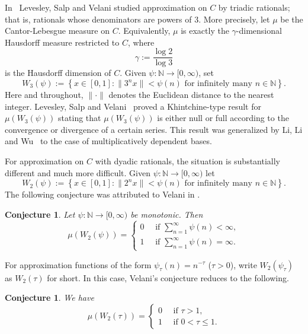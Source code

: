 \documentclass[10pt,a4paper]{amsart}
\numberwithin{equation}{section} %
\newtheorem{conj}[thm]{Conjecture}
\newtheorem{specialcon}{Conjecture}
\newcommand{\N}{\mathbb{N}}
\begin{document}
In~\cite{LSV07O} Levesley, Salp and Velani studied approximation on $C$ by triadic rationals; that is, rationals whose  denominators  are powers of $3$.  More precisely, let $\mu$ be the  Cantor-Lebesgue measure on $C$. Equivalently, $\mu$ is exactly the $\gamma$-dimensional Hausdorff measure restricted to $C$, where 
\[\gamma:=\frac{\log2}{\log3}\]
is the Hausdorff dimension of $C$. Given $\psi: \N\to [0,\infty)$, set 
\[W_3(\psi):=\left\{x\in [0,1]: \|3^nx\|<\psi(n)\text{ for infinitely many   }n\in\N\right\}.\]
Here and throughout,  $\|\cdot\|$ denotes  the Euclidean distance to the nearest integer.   Levesley, Salp and Velani~\cite{LSV07O} proved a Khintchine-type result for $\mu(W_3(\psi))$ stating that $\mu(W_3(\psi))$ is either null or full according to the convergence or divergence of a certain series.  This result was generalized by Li, Li and Wu~\cite{LLW25Z} to the case of multiplicatively dependent bases.

For approximation on $C$ with dyadic rationals, the situation is substantially different and much more difficult. Given $\psi:\N\to [0,\infty)$ let 
\begin{equation}\label{eqW2psi}
W_2(\psi):=\left\{x\in [0,1]: \|2^nx\|< \psi(n)\text{ for infinitely many   }n\in\N\right\}.
\end{equation}
The following conjecture was attributed to Velani in  \cite{ACY24}. 
\begin{conj}
\label{ConjVelani}
Let $\psi:\N\to [0,\infty)$ be monotonic. Then 
\[\mu(W_2(\psi))=\begin{cases}
	0 \quad  \text{ if }\sum_{n=1}^{\infty}\psi(n)<\infty,\\
	1 \quad \text{ if }\sum_{n=1}^{\infty}\psi(n)=\infty.
\end{cases}\]
\end{conj}
For approximation functions of the form $\psi_{\tau}(n)=n^{-\tau}$ ($\tau> 0$), write $W_2(\psi_{\tau})$ as $W_2(\tau)$ for short. In this case,  Velani's conjecture reduces to the following. 
\begin{specialcon}
\label{ConjVelanitau}
We have \[\mu(W_2(\tau))=\begin{cases}
	0 \quad  \text{ if }\tau>1,\\
	1 \quad \text{ if }0<\tau\leq 1.
\end{cases}\]
\end{specialcon}
\end{document}
